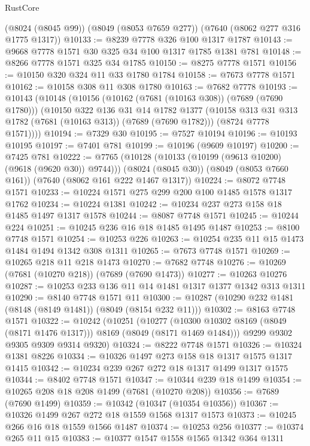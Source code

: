 \begin{lexlean}{RustCore}
\begin{coremodule}
    (@8024 (@8045 @99))
    (@8049 (@8053 @7659 @277))
    (@7640 (@8062 @277 @316 @1775 @1317))
@10133 := @8239 @7778 @326 @100 @1317 @1787
@10143 := @9668 @7778 @1571 @30 @325 @34 @100 @1317 @1785 @1381 @781
@10148 := @8266 @7778 @1571 @325 @34 @1785
@10150 := @8275 @7778 @1571
@10156 := @10150 @320 @324 @11 @33 @1780 @1784
@10158 := @7673 @7778 @1571
@10162 := @10158 @308 @11 @308 @1780
@10163 := @7682 @7778
@10193 := @10143
    (@10148
      (@10156
        (@10162 (@7681 (@10163 @308)) (@7689 (@7690 @1780)))
        (@10150
          @322
          @136
          @31
          @14
          @1782
          @1377
          (@10158 @313 @31 @313 @1782 (@7681 (@10163 @313)) (@7689 (@7690 @1782)))
          (@8724 @7778 @1571))))
@10194 := @7329 @30
@10195 := @7527 @10194
@10196 := @10193 @10195
@10197 := @7401 @781
@10199 := @10196 (@9609 @10197)
@10200 := @7425 @781
@10222 := @7765
    (@10128 (@10133 (@10199 (@9613 @10200) (@9618 (@9620 @30)) @9744)))
    (@8024 (@8045 @30))
    (@8049 (@8053 @7660 @161))
    (@7640 (@8062 @161 @222 @1467 @1317))
@10224 := @8072 @7748 @1571
@10233 := @10224 @1571 @275 @299 @200 @100 @1485 @1578 @1317 @1762
@10234 := @10224 @1381
@10242 := @10234 @237 @273 @158 @18 @1485 @1497 @1317 @1578
@10244 := @8087 @7748 @1571
@10245 := @10244 @224
@10251 := @10245 @236 @16 @18 @1485 @1495 @1487
@10253 := @8100 @7748 @1571
@10254 := @10253 @226
@10263 := @10254 @235 @11 @15 @1473 @1484 @1494 @1342 @308 @1311
@10265 := @7673 @7748 @1571
@10269 := @10265 @218 @11 @218 @1473
@10270 := @7682 @7748
@10276 := @10269 (@7681 (@10270 @218)) (@7689 (@7690 @1473))
@10277 := @10263 @10276
@10287 := @10253 @233 @136 @11 @14 @1481 @1317 @1377 @1342 @313 @1311
@10290 := @8140 @7748 @1571 @11
@10300 := @10287 (@10290 @232 @1481 (@8148 (@8149 @1481)) (@8049 (@8154 @232 @11)))
@10302 := @8163 @7748 @1571
@10322 := @10242
    (@10251
      (@10277 (@10300 @10302 @8169 (@8049 (@8171 @1476 @1317))) @8169 (@8049 (@8171 @1469 @1484)))
      @9299
      @9302
      @9305
      @9309
      @9314
      @9320)
@10324 := @8222 @7748 @1571
@10326 := @10324 @1381 @8226
@10334 := @10326 @1497 @273 @158 @18 @1317 @1575 @1317 @1415
@10342 := @10234 @239 @267 @272 @18 @1317 @1499 @1317 @1575
@10344 := @8402 @7748 @1571
@10347 := @10344 @239 @18 @1499
@10354 := @10265 @208 @18 @208 @1499 (@7681 (@10270 @208))
@10356 := @7689 (@7690 @1499)
@10359 := @10342 (@10347 (@10354 @10356))
@10367 := @10326 @1499 @267 @272 @18 @1559 @1568 @1317 @1573
@10373 := @10245 @266 @16 @18 @1559 @1566 @1487
@10374 := @10253 @256
@10377 := @10374 @265 @11 @15
@10383 := @10377 @1547 @1558 @1565 @1342 @364 @1311

\end{coremodule}
\end{lexlean}
